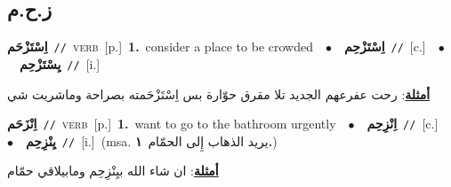 \documentclass[10pt,a4paper,twoside]{article} %
\begin{document}
\begin{multicols}{2}
\vspace{-3mm}
\subsection*{\color{blue}\foreignlanguage{arabic}{ز.ح.م}\color{blue}{}} 

{\setlength\topsep{0pt}\textbf{\foreignlanguage{arabic}{اِسْتَزْحَم}}\ {\color{gray}\texttt{//}\color{black}}\ \textsc{verb}\ [p.]\ \textbf{1.}~consider a place to be crowded\ \ $\bullet$\ \ \setlength\topsep{0pt}\textbf{\foreignlanguage{arabic}{اِسْتَزْحِم}}\ {\color{gray}\texttt{//}\color{black}}\ [c.]\ \ $\bullet$\ \ \setlength\topsep{0pt}\textbf{\foreignlanguage{arabic}{يِسْتَزْحِم}}\ {\color{gray}\texttt{//}\color{black}}\ [i.]\  \begin{flushright}\color{gray}\foreignlanguage{arabic}{\textbf{\underline{\foreignlanguage{arabic}{أمثلة}}}: رحت عفرعهم الجديد تلا مقرق حوّارة بس اِسْتَزْحَمته بصراحة وماشريت شي}\end{flushright}\color{black}} \vspace{2mm}

{\setlength\topsep{0pt}\textbf{\foreignlanguage{arabic}{اِنْزَحَم}}\ {\color{gray}\texttt{//}\color{black}}\ \textsc{verb}\ [p.]\ \textbf{1.}~want to go to the bathroom urgently\ \ $\bullet$\ \ \setlength\topsep{0pt}\textbf{\foreignlanguage{arabic}{اِنْزِحِم}}\ {\color{gray}\texttt{//}\color{black}}\ [c.]\ \ $\bullet$\ \ \setlength\topsep{0pt}\textbf{\foreignlanguage{arabic}{يِنْزِحِم}}\ {\color{gray}\texttt{//}\color{black}}\ [i.]\ \color{gray}(msa. \foreignlanguage{arabic}{يريد الذهاب إِلى الحمّام}~\foreignlanguage{arabic}{\textbf{١.}})\color{black}\  \begin{flushright}\color{gray}\foreignlanguage{arabic}{\textbf{\underline{\foreignlanguage{arabic}{أمثلة}}}: ان شاء الله بيِنْزِحِم ومابيلاقي حمّام}\end{flushright}\color{black}} \vspace{2mm}


\end{multicols}
\end{document}
